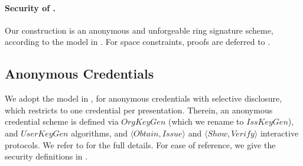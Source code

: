 
\paragraph{Security of \CUASRing.} %
Our \CUASRing construction is an anonymous and unforgeable ring signature
scheme, according to the model in \cite{bkm06}. For space constraints,
proofs are deferred to .



\subsection{Anonymous Credentials}
\label{ssec:related-models-ac}

We adopt the model in \cite{fhs19}, for anonymous credentials with selective
disclosure, which restricts to one credential per presentation. Therein, an
anonymous credential scheme is defined via $OrgKeyGen$ (which we rename to
$IssKeyGen$), and $UserKeyGen$ algorithms, and $\langle Obtain,Issue\rangle$
and $\langle Show,Verify \rangle$ interactive protocols. We
refer to \cite{fhs19} for the full details. For ease of reference, we give
the security definitions in .%

